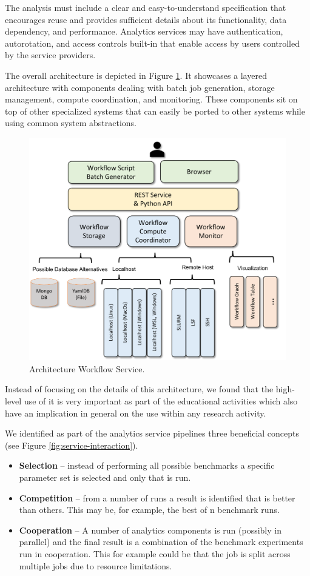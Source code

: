 \documentclass[utf8]{FrontiersinVancouver} %
\begin{document}
{The analysis must include a clear and easy-to-understand specification
that encourages reuse and provides sufficient details about its
functionality, data dependency, and performance. Analytics services
may have authentication, autorotation, and access controls built-in
that enable access by users controlled by the service providers.

The overall architecture is depicted in Figure \ref{fig:cc-2}. It
showcases a layered architecture with components dealing with batch
job generation, storage management, compute coordination, and
monitoring. These components sit on top of other specialized systems
that can easily be ported to other systems while using common system
abstractions.

\begin{figure}[htb]
    \centering
    \includegraphics[width=0.70\columnwidth]{images/cloudmesh-cc-new.pdf}
    \caption{Architecture Workflow Service.}
    \label{fig:cc-2}
\end{figure}

Instead of focusing on the details of this architecture, we found that
the high-level use of it is very important as part of the educational
activities which also have an implication in general on the use within
any research activity.

We identified as part of the  analytics service pipelines
three beneficial concepts (see Figure \ref{fig:service-interaction}).

\begin{itemize}
\item {\bf Selection} -- instead of performing all possible benchmarks
  a specific parameter set is selected and only that is run.
\item {\bf Competition} -- from a number of runs a result is
  identified that is better than others. This may be, for example, the
  best of n benchmark runs.
\item {\bf Cooperation} -- A number of analytics components is run
  (possibly in parallel) and the final result is a combination of the
  benchmark experiments run in cooperation. This for example could be
  that the job is split across multiple jobs due to resource
  limitations.
\end{itemize}

}
\end{document}
